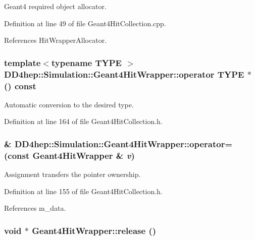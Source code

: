 Geant4 required object allocator. 

Definition at line 49 of file Geant4HitCollection.cpp.

References HitWrapperAllocator.\hypertarget{class_d_d4hep_1_1_simulation_1_1_geant4_hit_wrapper_ac06374f8717f37552b78d7adcfc29f7b}{
\subsubsection[{operator TYPE $\ast$}]{\setlength{\rightskip}{0pt plus 5cm}template$<$typename TYPE $>$ DD4hep::Simulation::Geant4HitWrapper::operator TYPE $\ast$ () const}}
\label{class_d_d4hep_1_1_simulation_1_1_geant4_hit_wrapper_ac06374f8717f37552b78d7adcfc29f7b}


Automatic conversion to the desired type. 

Definition at line 164 of file Geant4HitCollection.h.\hypertarget{class_d_d4hep_1_1_simulation_1_1_geant4_hit_wrapper_a93a51629cca576b0ff7328981b7c71ad}{
\subsubsection[{operator=}]{\& DD4hep::Simulation::Geant4HitWrapper::operator= (const {\bf Geant4HitWrapper} \& {\em v})}}
\label{class_d_d4hep_1_1_simulation_1_1_geant4_hit_wrapper_a93a51629cca576b0ff7328981b7c71ad}


Assignment transfers the pointer ownership. 

Definition at line 155 of file Geant4HitCollection.h.

References m\_\-data.\hypertarget{class_d_d4hep_1_1_simulation_1_1_geant4_hit_wrapper_a1af3edf59bb6c955fe91582394854acd}{
\subsubsection[{release}]{\setlength{\rightskip}{0pt plus 5cm}void $\ast$ Geant4HitWrapper::release ()}}
\label{class_d_d4hep_1_1_simulation_1_1_geant4_hit_wrapper_a1af3edf59bb6c955fe91582394854acd}


